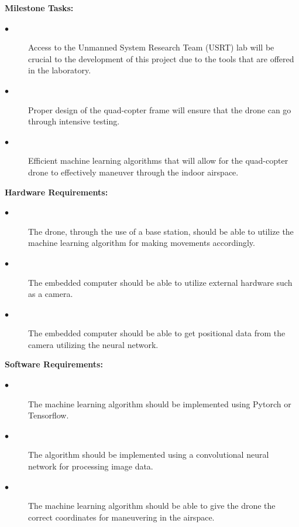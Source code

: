 \documentclass[12pt,onecolumn]{IEEEtran}			%
\begin{document}
\vspace{12pt} 

 \textbf{Milestone Tasks:}
 
 \begin{description}
  \item[$\bullet$ ] Access to the Unmanned System Research Team (USRT) lab will be crucial to the development of this project due to the tools that are offered in the laboratory. 
  \item[$\bullet$ ] Proper design of the quad-copter frame will ensure that the drone can go through intensive testing.  
  \item[$\bullet$ ] Efficient machine learning algorithms that will allow for the quad-copter drone to effectively maneuver through the indoor airspace. 
\end{description} 

\vspace{12pt} 

\textbf{Hardware Requirements:}
 
 \begin{description}
  \item[$\bullet$ ] The drone, through the use of a base station, should be able to utilize the machine learning algorithm for making movements accordingly. 
  \item[$\bullet$ ] The embedded computer should be able to utilize external hardware such as a camera. 
  \item[$\bullet$ ] The embedded computer should be able to get positional data from the camera utilizing the neural network. 
\end{description} 

\vspace{12pt} 

 \textbf{Software Requirements:}
 
 \begin{description}
  \item[$\bullet$ ] The machine learning algorithm should be implemented using Pytorch or Tensorflow. 
  \item[$\bullet$ ] The algorithm should be implemented using a convolutional neural network for processing image data. 
  \item[$\bullet$ ] The machine learning algorithm should be able to give the drone the correct coordinates for maneuvering in the airspace.
\end{description}
\vspace{12pt} 
\end{document}
